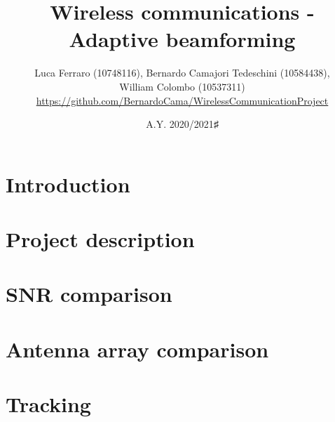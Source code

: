\documentclass{article} %
\title{\textbf{\huge{Wireless communications - Adaptive beamforming}}}
\author{Luca Ferraro (10748116), Bernardo Camajori Tedeschini (10584438), \\
            William Colombo (10537311)\\ 
\textcolor{url_blue}{\url{https://github.com/BernardoCama/WirelessCommunicationProject}}}
\date{A.Y. 2020/2021♯}
\begin{document}

\begin{titlingpage}
    \maketitle
\end{titlingpage}

\newpage{}

\tableofcontents
\listoffigures
\lstlistoflistings
\newpage{}

\clearpage
\section{Introduction}
\label{sect:introduction}



\clearpage
\section{Project description}
\label{sect:project}



\clearpage
\section{SNR comparison}
\label{sect:project}


\clearpage
\section{Antenna array comparison}
\label{sect:project}


\clearpage
\section{Tracking}
\label{sect:project}

\end{document}
